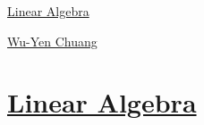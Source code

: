 \documentclass[11pt]{article}
\begin{document}
	\kaishu 
	\setcounter{section}{0}
	\begin{center}
		{\LARGE  \href{https://en.wikipedia.org/wiki/Linear_algebra}{Linear Algebra}}
		
		
		{\large \href{https://www.math.ntu.edu.tw/entity_people/entity_people/21516}{Wu-Yen Chuang}}
	\end{center}
\setcounter{page}{1}



\vspace{-1cm}

\section*{\href{https://www.youtube.com/playlist?list=PLQqeHUV7RZ2PJFB54P2Wrf0LmRaIIGyET}{Linear Algebra }}
\end{document}
